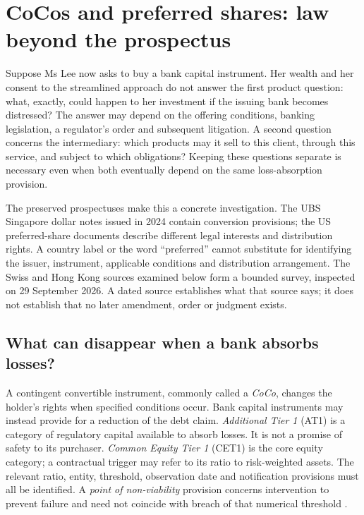 \section{CoCos and preferred shares: law beyond the prospectus}
\label{sec:coco-legal-risk}

Suppose Ms Lee now asks to buy a bank capital instrument. Her wealth and her
consent to the streamlined approach do not answer the first product question:
what, exactly, could happen to her investment if the issuing bank becomes
distressed? The answer may depend on the offering conditions, banking legislation,
a regulator's order and subsequent litigation. A second question concerns the
intermediary: which products may it sell to this client, through this service,
and subject to which obligations? Keeping these questions separate is necessary
even when both eventually depend on the same loss-absorption provision.

The preserved prospectuses make this a concrete investigation. The UBS Singapore
dollar notes issued in 2024 contain conversion provisions; the US preferred-share
documents describe different legal interests and distribution rights. A country
label or the word ``preferred'' cannot substitute for identifying the issuer,
instrument, applicable conditions and distribution arrangement. The Swiss and
Hong Kong sources examined below form a bounded survey, inspected on
29 September 2026. A dated source establishes what that source says; it does not
establish that no later amendment, order or judgment exists.

\subsection{What can disappear when a bank absorbs losses?}

A contingent convertible instrument, commonly called a \emph{CoCo}, changes the
holder's rights when specified conditions occur. Bank capital instruments may
instead provide for a reduction of the debt claim. \emph{Additional Tier 1}
(AT1) is a category of regulatory capital available to absorb losses. It is not
a promise of safety to its purchaser. \emph{Common Equity Tier 1} (CET1) is the
core equity category; a contractual trigger may refer to its ratio to
risk-weighted assets. The relevant ratio, entity, threshold, observation date
and notification provisions must all be identified. A \emph{point of
non-viability} provision concerns intervention to prevent failure and need not
coincide with breach of that numerical threshold
\citep[arts.~27, 27a and 29]{swisscao2025}.

